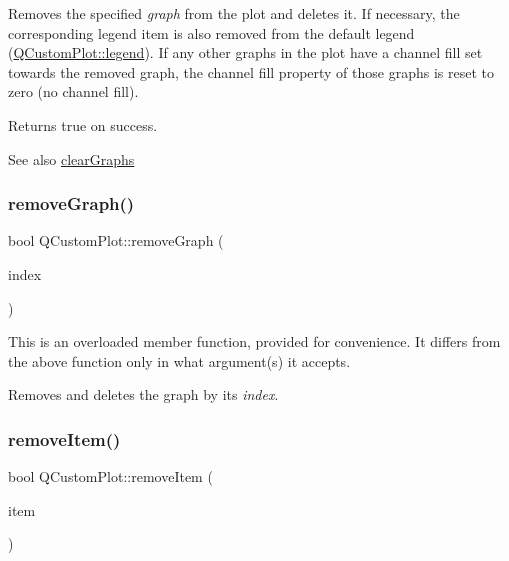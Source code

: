 Removes the specified {\itshape graph} from the plot and deletes it. If necessary, the corresponding legend item is also removed from the default legend (\mbox{\hyperlink{class_q_custom_plot_a4eadcd237dc6a09938b68b16877fa6af}{Q\+Custom\+Plot\+::legend}}). If any other graphs in the plot have a channel fill set towards the removed graph, the channel fill property of those graphs is reset to zero (no channel fill).

Returns true on success.

\begin{DoxySeeAlso}{See also}
\mbox{\hyperlink{class_q_custom_plot_ab0f3abff2d2f7df3668b5836f39207fa}{clear\+Graphs}} 
\end{DoxySeeAlso}
\mbox{\label{class_q_custom_plot_a9554b3d2d5b10c0f884bd4010b6c192c}} 
\subsubsection{\texorpdfstring{remove\+Graph()}{removeGraph()}\hspace{0.1cm}{\footnotesize\ttfamily [2/2]}}
{\footnotesize\ttfamily bool Q\+Custom\+Plot\+::remove\+Graph (\begin{DoxyParamCaption}\item[{int}]{index }\end{DoxyParamCaption})}

This is an overloaded member function, provided for convenience. It differs from the above function only in what argument(s) it accepts.

Removes and deletes the graph by its {\itshape index}. \mbox{\label{class_q_custom_plot_ae04446557292551e8fb6e2c106e1848d}} 
\subsubsection{\texorpdfstring{remove\+Item()}{removeItem()}\hspace{0.1cm}{\footnotesize\ttfamily [1/2]}}
{\footnotesize\ttfamily bool Q\+Custom\+Plot\+::remove\+Item (\begin{DoxyParamCaption}\item[{\mbox{\hyperlink{class_q_c_p_abstract_item}{Q\+C\+P\+Abstract\+Item}} $\ast$}]{item }\end{DoxyParamCaption})}

